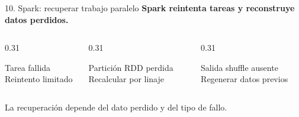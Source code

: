 \begin{frame}{10. Spark: recuperar trabajo paralelo}
  \vspace{0.28cm}
  {\large\bfseries Spark reintenta tareas y reconstruye datos perdidos.}\,\cite{sparkConfiguration,sparkRddGuide,sparkFetchFailed}\par
  \vspace{0.60cm}
  \begin{columns}[T,onlytextwidth]
    \begin{column}{0.31\textwidth}
      \begin{block}{Tarea fallida}
        Reintento limitado\,\cite{sparkConfiguration}
      \end{block}
    \end{column}
    \begin{column}{0.31\textwidth}
      \begin{block}{Partición RDD perdida}
        Recalcular por linaje\,\cite{sparkRddGuide}
      \end{block}
    \end{column}
    \begin{column}{0.31\textwidth}
      \begin{block}{Salida shuffle ausente}
        Regenerar datos previos\,\cite{sparkFetchFailed}
      \end{block}
    \end{column}
  \end{columns}
  \vspace{0.48cm}
  {\small\color{textoSuave}La recuperación depende del dato perdido y del tipo de fallo.\,\cite{sparkRddGuide,sparkFetchFailed}}
\end{frame}

